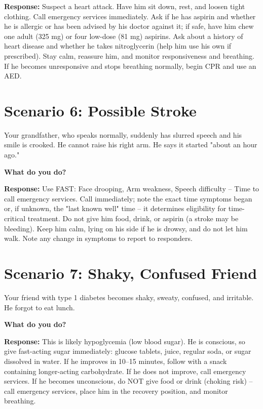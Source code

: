 \textbf{Response:} Suspect a heart attack. Have him sit down, rest, and loosen tight clothing. Call emergency services immediately. Ask if he has aspirin and whether he is allergic or has been advised by his doctor against it; if safe, have him chew one adult (325 mg) or four low-dose (81 mg) aspirins. Ask about a history of heart disease and whether he takes nitroglycerin (help him use his own if prescribed). Stay calm, reassure him, and monitor responsiveness and breathing. If he becomes unresponsive and stops breathing normally, begin CPR and use an AED.

\section{Scenario 6: Possible Stroke}

Your grandfather, who speaks normally, suddenly has slurred speech and his smile is crooked. He cannot raise his right arm. He says it started "about an hour ago."

\textbf{What do you do?}

\textbf{Response:} Use FAST: Face drooping, Arm weakness, Speech difficulty -- Time to call emergency services. Call immediately; note the exact time symptoms began or, if unknown, the "last known well" time -- it determines eligibility for time-critical treatment. Do not give him food, drink, or aspirin (a stroke may be bleeding). Keep him calm, lying on his side if he is drowsy, and do not let him walk. Note any change in symptoms to report to responders.

\section{Scenario 7: Shaky, Confused Friend}

Your friend with type 1 diabetes becomes shaky, sweaty, confused, and irritable. He forgot to eat lunch.

\textbf{What do you do?}

\textbf{Response:} This is likely hypoglycemia (low blood sugar). He is conscious, so give fast-acting sugar immediately: glucose tablets, juice, regular soda, or sugar dissolved in water. If he improves in 10--15 minutes, follow with a snack containing longer-acting carbohydrate. If he does not improve, call emergency services. If he becomes unconscious, do NOT give food or drink (choking risk) -- call emergency services, place him in the recovery position, and monitor breathing.

